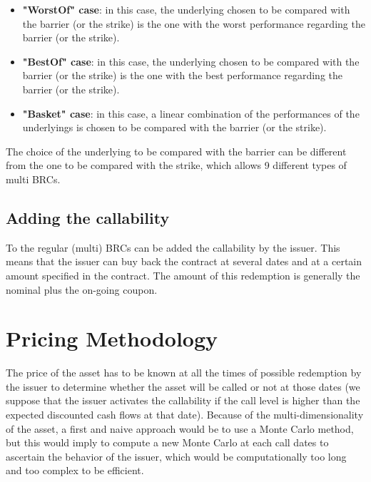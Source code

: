 \documentclass[a4paper,11pt,english]{book}
\begin{document}
\begin{itemize}
    \item \textbf{"WorstOf" case}: in this case, the underlying chosen to be compared with the barrier (or the strike) is the one with the worst performance regarding the barrier (or the strike).
    \item \textbf{"BestOf" case}: in this case, the underlying chosen to be compared with the barrier (or the strike) is the one with the best performance regarding the barrier (or the strike).
    \item \textbf{"Basket" case}: in this case, a linear combination of the performances of the underlyings is chosen to be compared with the barrier (or the strike).
\end{itemize}

The choice of the underlying to be compared with the barrier can be different from the one to be compared with the strike, which allows 9 different types of multi BRCs.

\section{Adding the callability}
To the regular (multi) BRCs can be added the callability by the issuer. This means that the issuer can buy back the contract at several dates and at a certain amount specified in the contract. The amount of this redemption is generally the nominal plus the on-going coupon.


\pagestyle{fancy}

\chapter{Pricing Methodology}
\label{chap:pricing-methodology}
The price of the asset has to be known at all the times of possible redemption by the issuer to determine whether the asset will be called or not at those dates (we suppose that the issuer activates the callability if the call level is higher than the expected discounted cash flows at that date). Because of the multi-dimensionality of the asset, a first and naive approach would be to use a Monte Carlo method, but this would imply to compute a new Monte Carlo at each call dates to ascertain the behavior of the issuer, which would be computationally too long and too complex to be efficient. 
\end{document}
